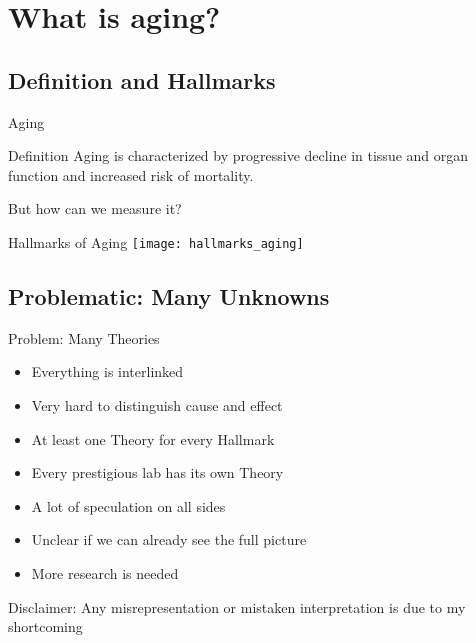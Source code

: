 \section{What is aging?}

\subsection{Definition and Hallmarks}

\begin{frame}[c]{Aging}
    \large

    \begin{block}{Definition \cite{sen2016epigenetic}}
        Aging is characterized by progressive decline in tissue and organ
        function and increased risk of mortality.
    \end{block}
    \pause
    But how can we measure it?
\end{frame}


\begin{frame}[c]{Hallmarks of Aging}
    \texttt{[image: hallmarks\_aging]} \\
    \cite{lopez2013hallmarks}
\end{frame}

\subsection{Problematic: Many Unknowns}

\begin{frame}[c]{Problem: Many Theories}
    \large
    \begin{itemize}[<+(1)->]
        \item Everything is interlinked
        \item Very hard to distinguish cause and effect
        \item At least one Theory for every Hallmark
        \item Every prestigious lab has its own Theory
        \item A lot of speculation on all sides
        \item Unclear if we can already see the full picture
        \item More research is needed
    \end{itemize}
\end{frame}

\addtocounter{framenumber}{1}
\begin{frame}[standout]
    Disclaimer: Any misrepresentation or mistaken interpretation is due to my shortcoming
\end{frame}
